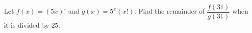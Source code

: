 Let $f(x) = (5x)!$ and $g(x) = 5^x(x!)$. Find the remainder of $\dfrac{f(31)}{g(31)}$ when it is divided by $25$.
